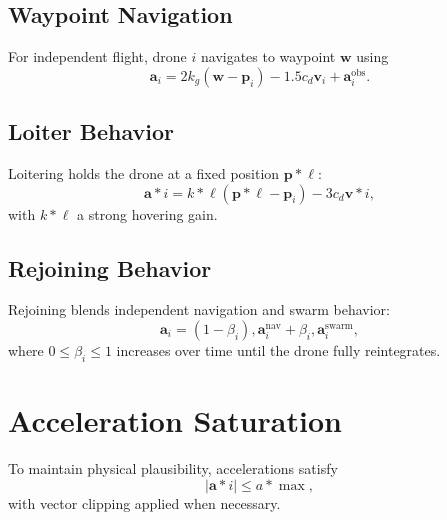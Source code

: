 \documentclass[12pt]{article}
\begin{document}
\subsection{Waypoint Navigation}
For independent flight, drone $i$ navigates to waypoint $\mathbf{w}$ using
\begin{equation}
\mathbf{a}_i = 2k_g (\mathbf{w} - \mathbf{p}_i) - 1.5 c_d \mathbf{v}_i + \mathbf{a}_i^{\mathrm{obs}}.
\end{equation}

\subsection{Loiter Behavior}
Loitering holds the drone at a fixed position $\mathbf{p}*\ell$:
\begin{equation}
\mathbf{a}*i = k*{\ell}(\mathbf{p}*\ell - \mathbf{p}_i) - 3c_d\mathbf{v}*i,
\end{equation}
with $k*{\ell}$ a strong hovering gain.

\subsection{Rejoining Behavior}
Rejoining blends independent navigation and swarm behavior:
\begin{equation}
\mathbf{a}_i = (1-\beta_i), \mathbf{a}_i^{\mathrm{nav}} + \beta_i, \mathbf{a}_i^{\mathrm{swarm}},
\end{equation}
where $0 \le \beta_i \le 1$ increases over time until the drone fully reintegrates.

\section{Acceleration Saturation}
To maintain physical plausibility, accelerations satisfy
\begin{equation}
|\mathbf{a}*i| \le a*{\max},
\end{equation}
with vector clipping applied when necessary.
\end{document}
